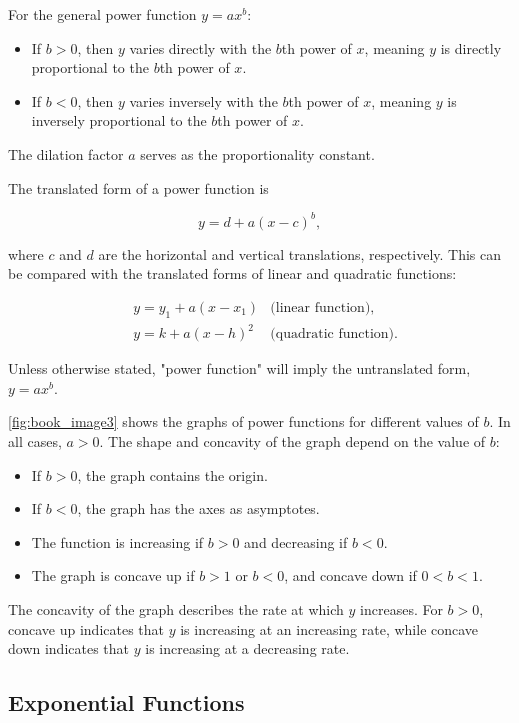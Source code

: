 For the general power function \(y = ax^b\):
\begin{itemize}
    \item If \(b > 0\), then \(y\) varies directly with the \(b\)th power of \(x\), meaning \(y\) is directly proportional to the \(b\)th power of \(x\).
    \item If \(b < 0\), then \(y\) varies inversely with the \(b\)th power of \(x\), meaning \(y\) is inversely proportional to the \(b\)th power of \(x\).
\end{itemize}

The dilation factor \(a\) serves as the proportionality constant.

The translated form of a power function is

\[
y = d + a(x - c)^b,
\]

where \(c\) and \(d\) are the horizontal and vertical translations, respectively. This can be compared with the translated forms of linear and quadratic functions:

\[
\begin{aligned}
& y = y_1 + a(x - x_1) &\text{(linear function)}, \\
& y = k + a(x - h)^2 &\text{(quadratic function)}.
\end{aligned}
\]

Unless otherwise stated, "power function" will imply the untranslated form, \(y = ax^b\).

\autoref{fig:book_image3} shows the graphs of power functions for different values of \(b\). In all cases, \(a > 0\). The shape and concavity of the graph depend on the value of \(b\):
\begin{itemize}
    \item If \(b > 0\), the graph contains the origin.
    \item If \(b < 0\), the graph has the axes as asymptotes.
    \item The function is increasing if \(b > 0\) and decreasing if \(b < 0\).
    \item The graph is concave up if \(b > 1\) or \(b < 0\), and concave down if \(0 < b < 1\).
\end{itemize}
The concavity of the graph describes the rate at which \(y\) increases. For \(b > 0\), concave up indicates that \(y\) is increasing at an increasing rate, while concave down indicates that \(y\) is increasing at a decreasing rate.

\subsection*{Exponential Functions}


